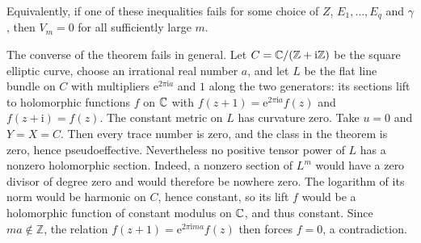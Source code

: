 Equivalently, if one of these inequalities fails for some choice of $Z$, $E_1,\ldots,E_q$ and $\gamma$, then $V_m=0$ for all sufficiently large $m$.

The converse of the theorem fails in general. Let $C=\mathbb C/(\mathbb Z+\mathrm{i}\mathbb Z)$ be the square elliptic curve, choose an irrational real number $a$, and let $L$ be the flat line bundle on $C$ with multipliers $\mathrm{e}^{2\pi\mathrm{i} a}$ and $1$ along the two generators: its sections lift to holomorphic functions $f$ on $\mathbb C$ with $f(z+1)=\mathrm{e}^{2\pi\mathrm{i} a}f(z)$ and $f(z+\mathrm{i})=f(z)$. The constant metric on $L$ has curvature zero. Take $u=0$ and $Y=X=C$. Then every trace number is zero, and the class in the theorem is zero, hence pseudoeffective. Nevertheless no positive tensor power of $L$ has a nonzero holomorphic section. Indeed, a nonzero section of $L^m$ would have a zero divisor of degree zero and would therefore be nowhere zero. The logarithm of its norm would be harmonic on $C$, hence constant, so its lift $f$ would be a holomorphic function of constant modulus on $\mathbb C$, and thus constant. Since $ma\notin\mathbb Z$, the relation $f(z+1)=\mathrm{e}^{2\pi\mathrm{i} ma}f(z)$ then forces $f=0$, a contradiction.
